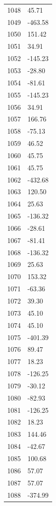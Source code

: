 \documentclass[a4paper,11pt]{article}
\begin{document}
\begin{center}
\begin{longtable}{|R{1.5cm}|R{2.5cm}|}
 1048 &        45.71 \\
 1049 &      -463.58 \\
 1050 &       151.42 \\
 1051 &        34.91 \\
 1052 &      -145.23 \\
 1053 &       -28.80 \\
 1054 &       -81.61 \\
 1055 &      -145.23 \\
 1056 &        34.91 \\
 1057 &       166.76 \\
 1058 &       -75.13 \\
 1059 &        46.52 \\
 1060 &        45.75 \\
 1061 &        45.75 \\
 1062 &      -432.68 \\
 1063 &       120.50 \\
 1064 &        25.63 \\
 1065 &      -136.32 \\
 1066 &       -28.61 \\
 1067 &       -81.41 \\
 1068 &      -136.32 \\
 1069 &        25.63 \\
 1070 &       153.32 \\
 1071 &       -63.36 \\
 1072 &        39.30 \\
 1073 &        45.10 \\
 1074 &        45.10 \\
 1075 &      -401.39 \\
 1076 &        89.47 \\
 1077 &        18.23 \\
 1078 &      -126.25 \\
 1079 &       -30.12 \\
 1080 &       -82.93 \\
 1081 &      -126.25 \\
 1082 &        18.23 \\
 1083 &       144.46 \\
 1084 &       -42.67 \\
 1085 &       100.68 \\
 1086 &        57.07 \\
 1087 &        57.07 \\
 1088 &      -374.99 \\

\end{longtable}
\end{center}
\end{document}

